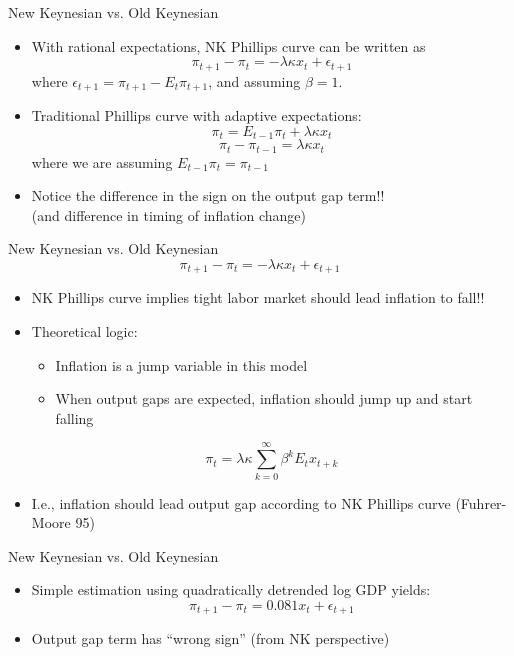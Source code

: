 \documentclass[11pt,aspectratio=169,xcolor={dvipsnames},hyperref={pdftex,pdfpagemode=UseNone,hidelinks,pdfdisplaydoctitle=true},usepdftitle=false]{beamer}
\begin{document}
\begin{frame}{New Keynesian vs. Old Keynesian}
\begin{itemize}
\itemsep1em 
\item With rational expectations, NK Phillips curve can be written as
\[ \pi_{t+1} - \pi_{t} = -\lambda \kappa x_{t} + \epsilon_{t+1} \]
where $\epsilon_{t+1} = \pi_{t+1} - E_{t} \pi_{t+1}$, and assuming $\beta = 1$.
\item Traditional Phillips curve with adaptive expectations:
\[ \pi_{t} = E_{t-1} \pi_{t} + \lambda \kappa x_{t} \]
\[ \pi_{t} - \pi_{t-1} = \lambda \kappa x_{t} \]
where we are assuming $ E_{t-1} \pi_{t} = \pi_{t-1} $
\item Notice the difference in the sign on the output gap term!! \\ (and difference in timing of inflation change)
\end{itemize}
\end{frame}

\begin{frame}{New Keynesian vs. Old Keynesian}
\[ \pi_{t+1} - \pi_{t} = -\lambda \kappa x_{t} + \epsilon_{t+1} \] \vspace{-15pt}
\begin{itemize}
\itemsep1em 
\item NK Phillips curve implies tight labor market should lead inflation to fall!!
\item Theoretical logic: 
\begin{itemize}
\item Inflation is a jump variable in this model
\item When output gaps are expected, inflation should jump up and start falling
\end{itemize}
\[ \pi_{t} = \lambda \kappa \sum_{k=0}^{\infty} \beta^{k} E_{t} x_{t+k}  \]
\item I.e., inflation should lead output gap according to NK Phillips curve (Fuhrer-Moore 95)
\end{itemize}
\end{frame}

\begin{frame}{New Keynesian vs. Old Keynesian}
\begin{itemize}
\itemsep1em
\item Simple estimation using quadratically detrended log GDP yields:
\[ \pi_{t+1} - \pi_{t} = 0.081 x_{t} + \epsilon_{t+1}  \]
\item Output gap term has ``wrong sign'' (from NK perspective)
\end{itemize}
\end{frame}
\end{document}
